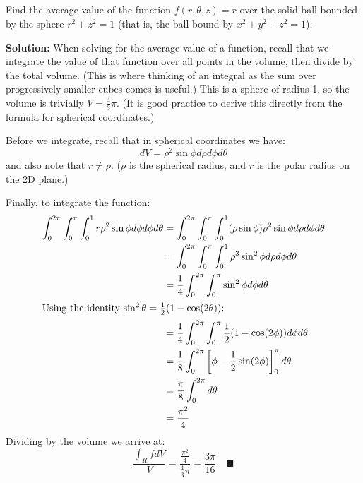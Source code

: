 \documentclass[letterpaper, 11pt]{article}
\begin{document}
\subsection{} Find the average value of the function $f(r, \theta, z) = r$ over the solid ball bounded by the sphere $r^2 + z^2 = 1$ (that is, the ball bound by $x^2 + y^2 + z^2 = 1$). 
\par \textbf{Solution:} When solving for the average value of a function, recall that we integrate the value of that function over all points in the volume, then divide by the total volume. (This is where thinking of an integral as the sum over progressively smaller cubes comes is useful.) This is a sphere of radius 1, so the volume is trivially $V = \frac{4}{3} \pi$. (It is good practice to derive this directly from the formula for spherical coordinates.) 
\par Before we integrate, recall that in spherical coordinates we have:
\[ dV = \rho^2 \sin \phi d\rho d\phi d\theta\]
and also note that $r \neq \rho$. ($\rho$ is the spherical radius, and $r$ is the polar radius on the 2D plane.) 
\par Finally, to integrate the function:
\begin{align*}
\int_0^{2\pi} \int_0^\pi \int_0^1 r \rho^2 \sin \phi d \phi d\phi d\theta &= \int_0^{2\pi} \int_0^\pi \int_0^1 (\rho \sin \phi) \rho^2 \sin \phi d \rho d\phi d\theta \\
&=  \int_0^{2\pi} \int_0^\pi \int_0^1 \rho^3 \sin^2 \phi d\rho d\phi d\theta \\
&= \frac{1}{4} \int_0^{2\pi} \int_0^\pi \sin^2 \phi d\phi d\theta \\
\intertext{Using the identity $\sin^2\theta = \frac{1}{2}(1 - \cos(2\theta))$:}
&= \frac{1}{4} \int_0^{2\pi} \int_0^\pi  \frac{1}{2}(1 - \cos(2\phi)) d\phi d\theta \\
&= \frac{1}{8} \int_0^{2 \pi} \left[ \phi - \frac{1}{2} \sin(2 \phi) \right]_0^\pi d \theta \\
&=  \frac{\pi}{8} \int_0^{2 \pi} d \theta \\
&= \frac{\pi^2}{4} 
\end{align*}
Dividing by the volume we arrive at:
\[ \frac{ \int_R f dV}{V} = \frac{ \frac{\pi^2}{4}}{\frac{4}{3} \pi} = \frac{3 \pi}{16} \quad\blacksquare \]
\end{document}
